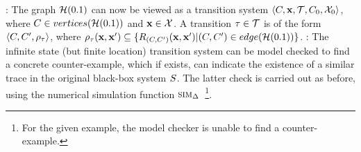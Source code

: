 \begin{example}
: The graph $\mathcal{H}(0.1)$ can now be viewed as a
    transition system $\left\langle C,\mathbf{x},\mathcal{T},C_0,\mathcal{X}_0 \right \rangle$,
    where $C \in vertices(\mathcal{H}(0.1))$ and $\mathbf{x} \in
    \mathcal{X}$. A transition $\tau \in \mathcal{T}$ is of the form
    $\left\langle C, C',\rho_{\tau} \right \rangle$, where $\rho_{\tau}(\mathbf{x},\mathbf{x}')
    \subseteq \{R_{(C,C')}(\mathbf{x},\mathbf{x}') |( C,C') \in
    edge(\mathcal{H}(0.1))\}$.
: The infinite state (but finite location) transition system can
    be model checked to find a concrete counter-example, which if
    exists, can indicate the existence of a similar trace in the
    original black-box system $S$. The latter check is carried
    out as before, using the numerical simulation function
        $\mbox{\sc sim}_\Delta$~\footnote{For the given example, the model checker is unable to
        find a counter-example.}.

\end{example}


%
